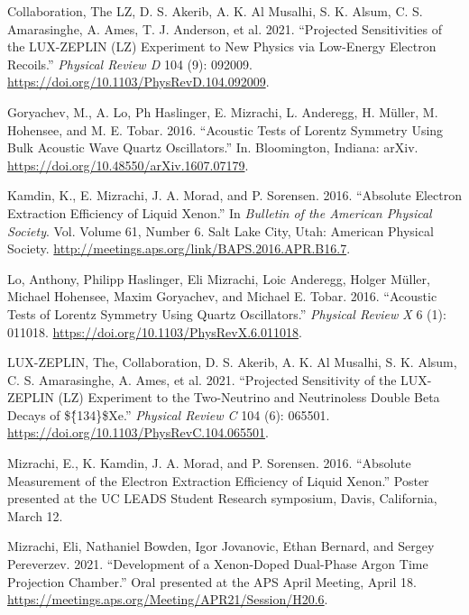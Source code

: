\documentclass[
  10pt,
  letterpaper,
  DIV=11,
  numbers=noendperiod]{scrartcl}
\newlength{\cslhangindent}
\newlength{\cslentryspacingunit} %
\newenvironment{CSLReferences}[2] %
 {%
  \setlength{\parindent}{0pt}
  \ifodd #1
  \let\oldpar\par
  \def\par{\hangindent=\cslhangindent\oldpar}
  \fi
  \setlength{\parskip}{#2\cslentryspacingunit}
 }%
 {}
\begin{document}
\begin{CSLReferences}{1}{0}
\leavevmode{}%
Collaboration, The LZ, D. S. Akerib, A. K. Al Musalhi, S. K. Alsum, C.
S. Amarasinghe, A. Ames, T. J. Anderson, et al. 2021. {``Projected
Sensitivities of the {LUX-ZEPLIN} ({LZ}) Experiment to New Physics via
Low-Energy Electron Recoils.''} \emph{Physical Review D} 104 (9):
092009. \url{https://doi.org/10.1103/PhysRevD.104.092009}.

\leavevmode{}%
Goryachev, M., A. Lo, Ph Haslinger, E. Mizrachi, L. Anderegg, H. Müller,
M. Hohensee, and M. E. Tobar. 2016. {``Acoustic Tests of {Lorentz}
Symmetry Using {Bulk Acoustic Wave} Quartz Oscillators.''} In.
{Bloomington, Indiana}: {arXiv}.
\url{https://doi.org/10.48550/arXiv.1607.07179}.

\leavevmode{}%
Kamdin, K., E. Mizrachi, J. A. Morad, and P. Sorensen. 2016. {``Absolute
{Electron Extraction Efficiency} of {Liquid Xenon}.''} In \emph{Bulletin
of the {American Physical Society}}. Vol. Volume 61, Number 6. {Salt
Lake City, Utah}: {American Physical Society}.
\url{http://meetings.aps.org/link/BAPS.2016.APR.B16.7}.

\leavevmode{}%
Lo, Anthony, Philipp Haslinger, Eli Mizrachi, Loic Anderegg, Holger
Müller, Michael Hohensee, Maxim Goryachev, and Michael E. Tobar. 2016.
{``Acoustic Tests of {Lorentz} Symmetry Using Quartz Oscillators.''}
\emph{Physical Review X} 6 (1): 011018.
\url{https://doi.org/10.1103/PhysRevX.6.011018}.

\leavevmode{}%
LUX-ZEPLIN, The, Collaboration, D. S. Akerib, A. K. Al Musalhi, S. K.
Alsum, C. S. Amarasinghe, A. Ames, et al. 2021. {``Projected Sensitivity
of the {LUX-ZEPLIN} ({LZ}) Experiment to the Two-Neutrino and
Neutrinoless Double Beta Decays of \$\{̂134\}\${Xe}.''} \emph{Physical
Review C} 104 (6): 065501.
\url{https://doi.org/10.1103/PhysRevC.104.065501}.

\leavevmode{}%
Mizrachi, E., K. Kamdin, J. A. Morad, and P. Sorensen. 2016. {``Absolute
{Measurement} of the {Electron Extraction Efficiency} of {Liquid
Xenon}.''} Poster presented at the {UC LEADS Student Research}
symposium, {Davis, California}, March 12.

\leavevmode{}%
Mizrachi, Eli, Nathaniel Bowden, Igor Jovanovic, Ethan Bernard, and
Sergey Pereverzev. 2021. {``Development of a {Xenon-Doped Dual-Phase
Argon Time Projection Chamber}.''} Oral presented at the {APS April
Meeting}, April 18.
\url{https://meetings.aps.org/Meeting/APR21/Session/H20.6}.


\end{CSLReferences}
\end{document}
